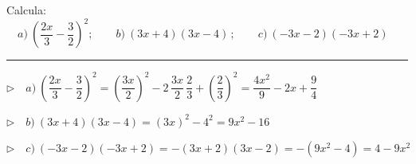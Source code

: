 \vspace{5mm}
\begin{miejercicio}

Calcula: $\quad a)\ \left( \dfrac{2x}{3}-\dfrac{3}{2} \right)^2 ; \qquad b)\ (3x+4)(3x-4)\, ; \qquad c)\ (-3x-2)(-3x+2)$

\vspace{-2mm}


\rule{250pt}{0.1pt}	

\vspace{2mm} $\triangleright \quad  a)\ \left( \dfrac{2x}{3}-\dfrac{3}{2} \right)^2 =\left( \dfrac{3x}{2} \right)^2 - 2 \, \dfrac{3x}{2} \, \dfrac{2}{3} + \left( \dfrac{2}{3} \right)^2=\dfrac{4x^2}{9}-2x+\dfrac{9}{4} $


\vspace{2mm} $\triangleright \quad b)\ (3x+4)(3x-4) = (3x)^2-4^2=9x^2-16$


\vspace{2mm} $\triangleright \quad c)\ (-3x-2)(-3x+2)=-(3x+2)(3x-2)=-(9x^2-4)=4-9x^2 $
\end{miejercicio}

